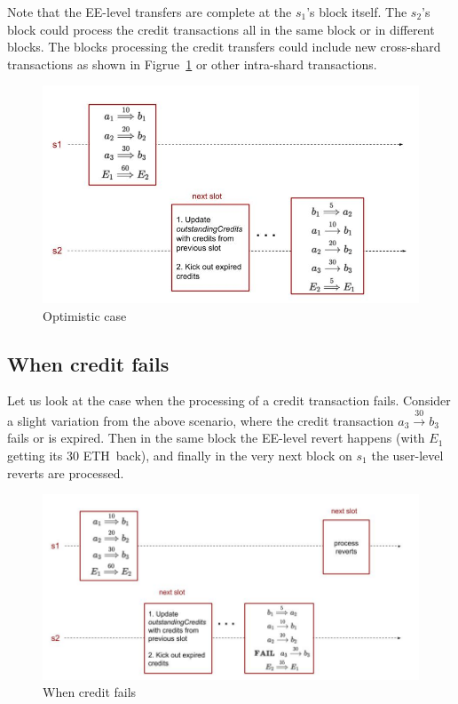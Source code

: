\documentclass{article}
\newcommand{\eth}[0]{ETH~}
\begin{document}
Note that the EE-level transfers are complete at the $s_1$'s block itself. The $s_2$'s block could process the credit transactions all in the same block or in different blocks. The blocks processing the credit transfers could include new cross-shard transactions as shown in Figrue~\ref{fig:optimistic} or other intra-shard transactions.

\begin{figure}[h]
	\includegraphics[scale=0.4]{OptmisiticCase.jpg}
	\caption{Optimistic case\label{fig:optimistic}}
\end{figure}

\subsection{When credit fails}
Let us look at the case when the processing of a credit transaction fails. Consider a slight variation from the above scenario, where the credit transaction $a_3 \stackrel{30}{\longrightarrow} b_3$ fails or is expired. Then in the same block the EE-level revert happens (with $E_1$ getting its $30$ \eth back), and finally in the very next block on $s_1$ the user-level reverts are processed.

\begin{figure}[h]
	\includegraphics[scale=0.4]{Credit.jpg}
	\caption{When credit fails\label{fig:credit}}
\end{figure}
\end{document}
